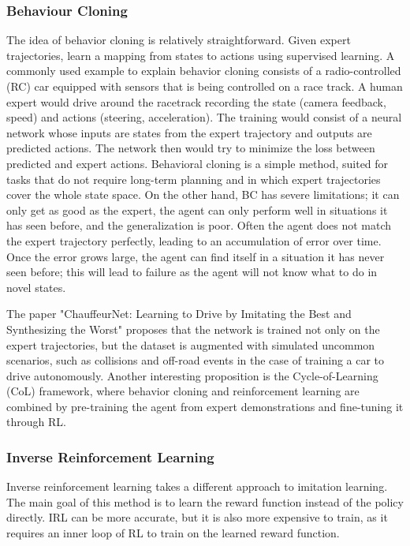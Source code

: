 \subsubsection{Behaviour Cloning}
The idea of behavior cloning \cite{bain1995framework} is relatively straightforward. Given expert trajectories, learn a mapping from states to actions using supervised learning. A commonly used example to explain behavior cloning consists of a radio-controlled (RC) car equipped with sensors that is being controlled on a race track. A human expert would drive around the racetrack recording the state (camera feedback, speed) and actions (steering, acceleration). The training would consist of a neural network whose inputs are states from the expert trajectory and outputs are predicted actions. The network then would try to minimize the loss between predicted and expert actions. Behavioral cloning is a simple method, suited for tasks that do not require long-term planning and in which expert trajectories cover the whole state space. On the other hand, BC has severe limitations; it can only get as good as the expert, the agent can only perform well in situations it has seen before, and the generalization is poor. Often the agent does not match the expert trajectory perfectly, leading to an accumulation of error over time. Once the error grows large, the agent can find itself in a situation it has never seen before; this will lead to failure as the agent will not know what to do in novel states. 

\bigskip \noindent
The paper "ChauffeurNet: Learning to Drive by Imitating the Best and Synthesizing the Worst" \cite{bansal2018chauffeurnet} proposes that the network is trained not only on the expert trajectories, but the dataset is augmented with simulated uncommon scenarios, such as collisions and off-road events in the case of training a car to drive autonomously. Another interesting proposition \cite{goecks2020integratingbehaviorcloningreinforcement} is the Cycle-of-Learning (CoL) framework, where behavior cloning and reinforcement learning are combined by pre-training the agent from expert demonstrations and fine-tuning it through RL.

\subsubsection{Inverse Reinforcement Learning}
Inverse reinforcement learning takes a different approach to imitation learning. The main goal of this method is to learn the reward function instead of the policy directly. IRL can be more accurate, but it is also more expensive to train, as it requires an inner loop of RL to train on the learned reward function.

